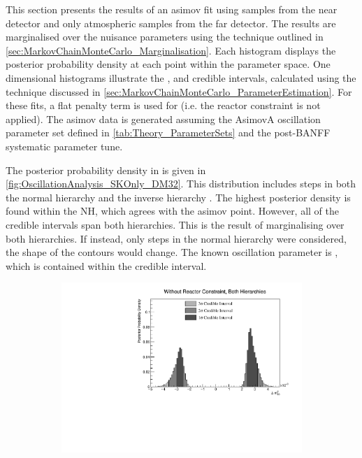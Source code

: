 This section presents the results of an asimov fit using samples from the near detector and only atmospheric samples from the far detector. The results are marginalised over the nuisance parameters using the technique outlined in \autoref{sec:MarkovChainMonteCarlo_Marginalisation}. Each histogram displays the posterior probability density at each point within the parameter space. One dimensional histograms illustrate the ,  and \quickmath{3\sigma} credible intervals, calculated using the technique discussed in \autoref{sec:MarkovChainMonteCarlo_ParameterEstimation}. For these fits, a flat penalty term is used for \sinsqreac (i.e. the reactor constraint is not applied). The asimov data is generated assuming the AsimovA oscillation parameter set defined in \autoref{tab:Theory_ParameterSets} and the post-BANFF systematic parameter tune.

The posterior probability density in \delmsqatm is given in \autoref{fig:OscillationAnalysis_SKOnly_DM32}. This distribution includes steps in both the normal hierarchy  and the inverse hierarchy . The highest posterior density is found within the NH, which agrees with the asimov point. However, all of the credible intervals span both hierarchies. This is the result of marginalising over both hierarchies. If instead, only steps in the normal hierarchy were considered, the shape of the contours would change. The known oscillation parameter is , which is contained within the \quickmath{1\sigma} credible interval.

\begin{figure}[h]
  \begin{subfigure}[t]{1.0\textwidth}
    \includegraphics[width=\textwidth, trim={0mm 0mm 0mm 0mm}, clip,page=1]{Figures/OA/SKOnlyFit/Contours_1D_dm32_BH_1_woRC_UnSmeared_CredibleInterval.pdf}
  \end{subfigure}
  \caption{}
  \label{fig:OscillationAnalysis_SKOnly_DM32}
\end{figure}

